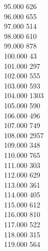 { 95.000	626 \\
 96.000	655 \\
 97.000	514 \\
 98.000	610 \\
 99.000	878 \\
 100.000	43 \\
 101.000	297 \\
 102.000	555 \\
 103.000	593 \\
 104.000	1303 \\
 105.000	590 \\
 106.000	496 \\
 107.000	749 \\
 108.000	2957 \\
 109.000	348 \\
 110.000	765 \\
 111.000	303 \\
 112.000	629 \\
 113.000	361 \\
 114.000	405 \\
 115.000	612 \\
 116.000	810 \\
 117.000	522 \\
 118.000	315 \\
 119.000	564 \\
}
